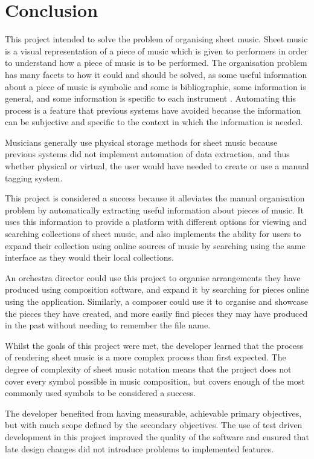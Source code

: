 \section{Conclusion}
This project intended to solve the problem of organising sheet music. Sheet music is a visual representation of a piece of music which is given to performers in order to understand how a piece of music is to be performed. The organisation problem has many facets to how it could and should be solved, as some useful information about a piece of music is symbolic and some is bibliographic, some information is general, and some information is specific to each instrument \parencite{MIR}. Automating this process is a feature that previous systems have avoided because the information can be subjective and specific to the context in which the information is needed.

Musicians generally use physical storage methods for sheet music because previous systems did not implement automation of data extraction, and thus whether physical or virtual, the user would have needed to create or use a manual tagging system.

This project is considered a success because it alleviates the manual organisation problem by automatically extracting useful information about pieces of music. It uses this information to provide a platform with different options for viewing and searching collections of sheet music, and also implements the ability for users to expand their collection using online sources of music by searching using the same interface as they would their local collections.

An orchestra director could use this project to organise arrangements they have produced using composition software, and expand it by searching for pieces online using the application. Similarly, a composer could use it to organise and showcase the pieces they have created, and more easily find pieces they may have produced in the past without needing to remember the file name. 

Whilst the goals of this project were met, the developer learned that the process of rendering sheet music is a more complex process than first expected. The degree of complexity of sheet music notation means that the project does not cover every symbol possible in music composition, but covers enough of the most commonly used symbols to be considered a success.

The developer benefited from having measurable, achievable primary objectives, but with much scope defined by the secondary objectives. The use of test driven development in this project improved the quality of the software and ensured that late design changes did not introduce problems to implemented features.

